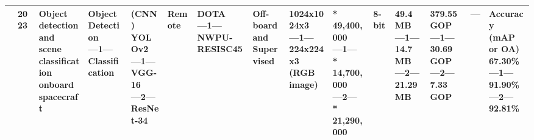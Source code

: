 \begin{center}
{\begin{tabular}{lllllllllllllll}
\cite{niAlgorithmHardwareCoOptimizationDeployment2023} & 2023 & \makecell[tl]{Object detection\\ and scene\\ classification\\ onboard\\ spacecraft} & \makecell[tl]{Object\\ Detection\\ ---1---\\ Classification} & \makecell[tl]{(CNN)\\ YOLOv2\\ ---1---\\ VGG-16\\ ---2---\\ ResNet-34} & Remote & \makecell[tl]{DOTA\\ ---1---\\ NWPU-RESISC45} & \makecell[tl]{Off-board\\ and\\ Supervised} & \makecell[tl]{1024x1024x3\\ ---1---\\ 224x224x3\\ (RGB image)} & \makecell[tl]{* 49,400,000\\ ---1---\\ * 14,700,000\\ ---2---\\ * 21,290,000} & 8-bit & \makecell[tl]{49.4 MB\\ ---1---\\ 14.7 MB\\ ---2---\\ 21.29 MB} & \makecell[tl]{379.55 GOP\\ ---1---\\ 30.69 GOP\\ ---2---\\ 7.33 GOP} & --- & \makecell[tl]{Accuracy\\ (mAP or OA)\\ 67.30\%\\ ---1---\\ 91.90\%\\ ---2---\\ 92.81\%\\}  \\ \hline

\end{tabular}}
\end{center}
